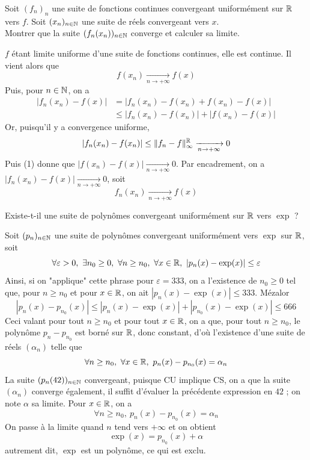 \begin{exo}
	\label{seriesfonc1}
	Soit $(f_n)_n$ une suite de fonctions continues convergeant uniformément 
	sur $\operatorname{\mathbb R}$ vers $f$. 
	Soit $(x_n)_{n\in\operatorname{\mathbb N}}$ une suite de réels convergeant vers $x$.\\
	Montrer que la suite $(f_n(x_n))_{n\in\operatorname{\mathbb N}}$ converge et calculer sa limite.
\end{exo}

\begin{solution}
	$f$ étant limite uniforme d'une suite de fonctions continues, elle est continue. 
    Il vient alors que \[f(x_n)\xrightarrow[n\to+\infty]{} f(x)\tag{1}\]
	Puis, pour $n\in\operatorname{\mathbb N}$, on a 
    \begin{align*}
        |f_n(x_n)-f(x)|&=|f_n(x_n)-f(x_n)+f(x_n)-f(x)|\\ 
                    &\leq|f_n(x_n)-f(x_n)|+|f(x_n)-f(x)|
    \end{align*}
	Or, puisqu'il y a convergence uniforme,
    \[
        |f_n(x_n)-f(x_n)|\leq \lVert f_n-f\rVert_\infty^{\operatorname{\mathbb R}}\xrightarrow[n\to+\infty]{} 0
    \] 
    Puis (1) donne que $|f(x_n)-f(x)|\xrightarrow[n\to+\infty]{}0$.
    Par encadrement, on a $|f_n(x_n)-f(x)|\xrightarrow[n\to+\infty]{} 0$, soit \[\boxed{f_n(x_n)\xrightarrow[n\to+\infty]{}f(x)}\]
\end{solution}

\begin{exo}
	\label{seriesfonc2}
	Existe-t-il une suite de polynômes convergeant uniformément sur $\operatorname{\mathbb R}$ vers $\exp$ ?
\end{exo}

\begin{solution}
	Soit $(p_n)_{n\in\operatorname{\mathbb N}}$ une suite de polynômes convergeant uniformément vers $\exp$ sur $\operatorname{\mathbb R}$, soit 
    \[\forall \varepsilon > 0,\ \exists n_0\geq 0,\ \forall n\geq n_0,\ \forall x\in\R,\ |p_n(x)-\exp(x)|\leq \varepsilon\]
	Ainsi, si on "applique" cette phrase pour $\varepsilon = 333$, on a l'existence de $n_0\geq 0$ tel que, pour $n\geq n_0$ et pour $x\in\operatorname{\mathbb R}$, on ait $|p_n(x)-\exp(x)|\leq 333$. 
    Mézalor \[|p_n(x)-p_{n_0}(x)|\leq |p_n(x)-\exp(x)|+|p_{n_0}(x)-\exp(x)|\leq 666\]
	Ceci valant pour tout $n\geq n_0$ et pour tout $x\in\operatorname{\mathbb R}$, on a que, pour tout $n\geq n_0$, le polynôme $p_n-p_{n_0}$ est borné sur $\operatorname{\mathbb R}$, donc constant, 
    d'où l'existence d'une suite de réels $(\alpha_n)$ telle que \[\forall n\geq n_0,\ \forall x\in\operatorname{\mathbb R},\ p_n(x)-p_{n_0}(x)=\alpha_n\]
	La suite $(p_n(42))_{n\in\operatorname{\mathbb N}}$ convergeant, puisque CU implique CS, on a que la suite $(\alpha_n)$ converge également, 
    il suffit d'évaluer la précédente expression en $42$ ; on note $\alpha$ sa limite. Pour $x\in\operatorname{\mathbb R}$, on a \[\forall n\geq n_0,\ p_n(x)-p_{n_0}(x)=\alpha_n\]
	On passe à la limite quand $n$ tend vers $+\infty$ et on obtient \[\exp(x)=p_{n_0}(x)+\alpha\]
	autrement dit, $\exp$ est un polynôme, ce qui est exclu.
\end{solution}

